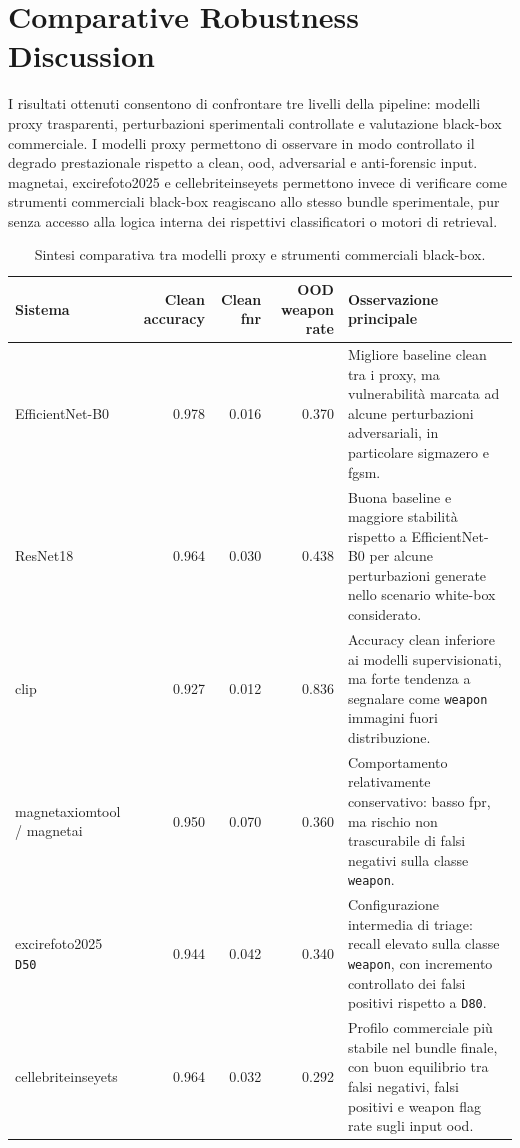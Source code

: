 
\section{Comparative Robustness Discussion}
\label{sec:results-comparative}

I risultati ottenuti consentono di confrontare tre livelli della pipeline:
modelli proxy trasparenti, perturbazioni sperimentali controllate e valutazione
black-box commerciale. I modelli proxy permettono di osservare in modo
controllato il degrado prestazionale rispetto a clean, \gls{ood}, adversarial e
anti-forensic input. \gls{magnetai}, \gls{excirefoto2025} e
\gls{cellebriteinseyets} permettono invece di verificare come strumenti
commerciali black-box reagiscano allo stesso bundle sperimentale, pur senza
accesso alla logica interna dei rispettivi classificatori o motori di retrieval.

\begin{table}[H]
\centering
\caption{Sintesi comparativa tra modelli proxy e strumenti commerciali black-box.}
\label{tab:results-comparative-summary}
\small
\begin{tabularx}{\textwidth}{@{}p{2.8cm} r r r X@{}}
\toprule
\textbf{Sistema} & \textbf{Clean accuracy} & \textbf{Clean \gls{fnr}} & \textbf{OOD weapon rate} & \textbf{Osservazione principale} \\
\midrule
EfficientNet-B0 & 0.978 & 0.016 & 0.370 & Migliore baseline clean tra i proxy, ma vulnerabilità marcata ad alcune perturbazioni adversariali, in particolare \gls{sigmazero} e \gls{fgsm}. \\
ResNet18 & 0.964 & 0.030 & 0.438 & Buona baseline e maggiore stabilità rispetto a EfficientNet-B0 per alcune perturbazioni generate nello scenario white-box considerato. \\
\gls{clip} & 0.927 & 0.012 & 0.836 & Accuracy clean inferiore ai modelli supervisionati, ma forte tendenza a segnalare come \texttt{weapon} immagini fuori distribuzione. \\
\gls{magnetaxiomtool} / \gls{magnetai} & 0.950 & 0.070 & 0.360 & Comportamento relativamente conservativo: basso \gls{fpr}, ma rischio non trascurabile di falsi negativi sulla classe \texttt{weapon}. \\
\gls{excirefoto2025} \texttt{D50} & 0.944 & 0.042 & 0.340 & Configurazione intermedia di triage: recall elevato sulla classe \texttt{weapon}, con incremento controllato dei falsi positivi rispetto a \texttt{D80}. \\
\gls{cellebriteinseyets} & 0.964 & 0.032 & 0.292 & Profilo commerciale più stabile nel bundle finale, con buon equilibrio tra falsi negativi, falsi positivi e weapon flag rate sugli input \gls{ood}. \\
\bottomrule
\end{tabularx}
\end{table}

